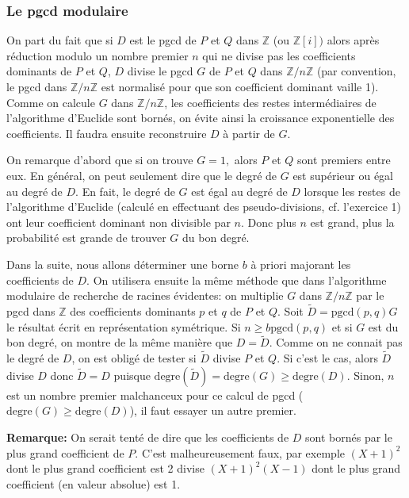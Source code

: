 \documentclass[a4paper,11pt]{article}
\begin{document}
\subsubsection{Le pgcd modulaire}

On part du fait que si $D$ est le pgcd de $P$ et $Q$ dans $\mathbb{Z}$ (ou
$\mathbb{Z} [ i ] )$ alors après réduction modulo un nombre premier $n$ qui ne
divise pas les coefficients dominants de $P$ et $Q$, $D$ divise le pgcd $G$ de
$P$ et $Q$ dans $\mathbb{Z} / n \mathbb{Z}$ (par convention, le pgcd dans
$\mathbb{Z} / n \mathbb{Z}$ est normalisé pour que son coefficient dominant
vaille 1). Comme on calcule $G$ dans $\mathbb{Z} / n \mathbb{Z}$, les
coefficients des restes intermédiaires de l'algorithme d'Euclide sont bornés,
on évite ainsi la croissance exponentielle des coefficients. Il faudra ensuite
reconstruire $D$ à partir de $G$.

On remarque d'abord que si on trouve $G = 1,$ alors $P$ et $Q$ sont premiers
entre eux. En général, on peut seulement dire que le degré de $G$ est
supérieur ou égal au degré de $D$. En fait, le degré de $G$ est égal au degré
de $D$ lorsque les restes de l'algorithme d'Euclide (calculé en effectuant des
pseudo-divisions, cf. l'exercice 1) ont leur coefficient dominant non
divisible par $n$. Donc plus $n$ est grand, plus la probabilité est grande de
trouver $G$ du bon degré.

Dans la suite, nous allons déterminer une borne $b$ à priori majorant 
les coefficients de
$D$. On utilisera ensuite la même méthode que dans l'algorithme modulaire de
recherche de racines évidentes: on multiplie $G$ dans $\mathbb{Z} / n
\mathbb{Z}$ par le pgcd dans $\mathbb{Z}$ des coefficients dominants $p$ et
$q$ de $P$ et $Q$. Soit $\tilde{D} = \mbox{pgcd} ( p, q ) G$ le résultat écrit
en représentation symétrique. Si $n \geqslant b \mbox{pgcd} ( p, q )$ et si
$G$ est du bon degré, on montre de la même manière que $D = \tilde{D}$. Comme 
on ne connait pas le degré de $D$, on est obligé de tester si $\tilde{D}$ 
divise $P$
et $Q$. Si c'est le cas, alors $\tilde{D}$ divise $D$ donc $\tilde{D} = D$
puisque $\mbox{degre} ( \tilde{D} ) = \mbox{degre} ( G ) \geqslant
\mbox{degre} ( D )$. Sinon, $n$ est un nombre premier malchanceux pour ce
calcul de pgcd ($\mbox{degre} ( G ) \geqslant \mbox{degre} ( D )$), il faut
essayer un autre premier.

{\bf{Remarque:}} On serait tenté de dire que les coefficients de $D$
sont bornés par le plus grand coefficient de $P$. C'est malheureusement faux,
par exemple $( X + 1 )^2$ dont le plus grand coefficient est 2 divise $( X + 1
)^2 ( X - 1 )$ dont le plus grand coefficient (en valeur absolue) est 1.
\end{document}
